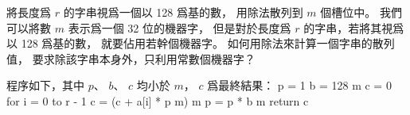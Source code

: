 \startEXERCISE
將長度爲 $r$ 的字串視爲一個以 128 爲基的數，
用除法散列到 $m$ 個槽位中。
我們可以將數 $m$ 表示爲一個 32 位的機器字，
但是對於長度爲 $r$ 的字串，若將其視爲以 128 爲基的數，
就要佔用若幹個機器字。
如何用除法來計算一個字串的散列值，
要求除該字串本身外，只利用常數個機器字？
\stopEXERCISE

\startANSWER
程序如下，其中 $p$、 $b$、 $c$ 均小於 $m$， $c$ 爲最終結果：
\startCLRSCODE
p = 1
b = 128 \mod m
c = 0
for i = 0 to r - 1
	c = (c + a[i] * p \mod m) \mod m
	p = p * b \mod m
return c
\stopCLRSCODE
\stopANSWER
